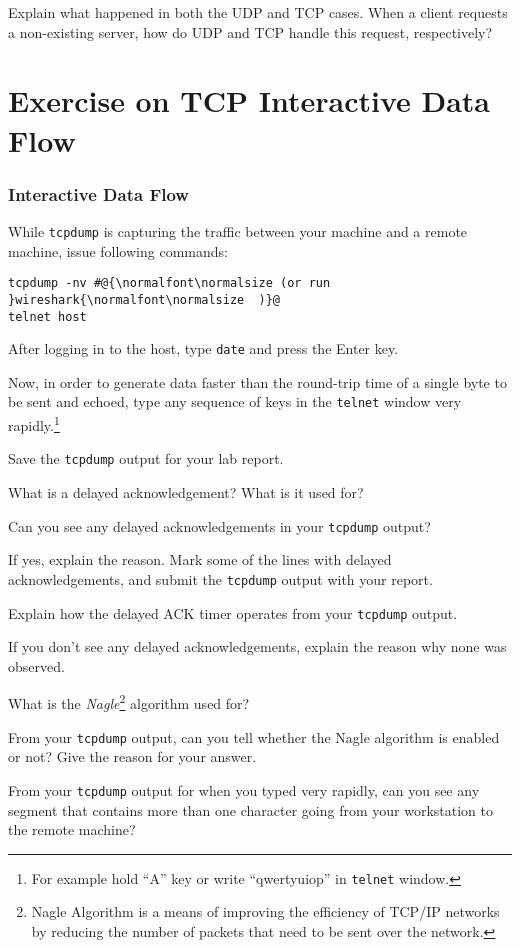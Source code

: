 \documentclass{../UTNetLab}
\begin{document}
    \begin{report}
        \item Explain what happened in both the UDP and TCP cases. When a client requests a non-existing server, how do UDP and TCP handle this request, respectively?
    \end{report}

\part{Exercise on TCP Interactive Data Flow}
\section{Interactive Data Flow}
While \lstinline{tcpdump} is capturing the traffic between your machine and a remote machine, issue following commands:
    \begin{lstlisting}[emph={host}]
tcpdump -nv #@{\normalfont\normalsize (or run }wireshark{\normalfont\normalsize  )}@
telnet host
    \end{lstlisting}
    After logging in to the host, type \lstinline{date} and press the {Enter} key.

    Now, in order to generate data faster than the round-trip time of a single byte to be sent and echoed, type any sequence of keys in the \lstinline{telnet} window very rapidly.\footnote{For example hold ``A'' key or write ``qwertyuiop'' in \lstinline{telnet} window.}

    {Save} the \lstinline{tcpdump} output for your lab report.
    
    \begin{report}
    \item What is a delayed acknowledgement?
    What is it used for?
    
    \item Can you see any delayed acknowledgements in your \lstinline{tcpdump} output?

    If yes, explain the reason.
    Mark some of the lines with delayed acknowledgements, and submit the \lstinline{tcpdump} output with your report.

    Explain how the delayed ACK timer operates from your \lstinline{tcpdump} output.

    If you don’t see any delayed acknowledgements, explain the reason why none was observed.
    
    \item What is the \textit{Nagle}\footnote{Nagle Algorithm is a means of improving the efficiency of TCP/IP networks by reducing the number of packets that need to be sent over the network.} algorithm used for?

    From your \lstinline{tcpdump} output, can you tell whether the Nagle algorithm is enabled or not? Give the reason for your answer.

    From your \lstinline{tcpdump} output for when you typed very rapidly, can you see any segment that contains more than one character going from your workstation to the remote machine?
    \end{report}
\end{document}
